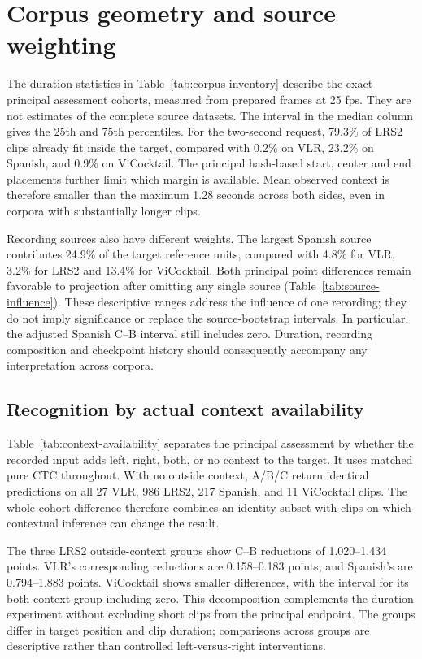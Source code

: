 \section{Corpus geometry and source weighting}
\label{app:corpus}


The duration statistics in Table~\ref{tab:corpus-inventory} describe the exact
principal assessment cohorts, measured from prepared frames at 25 fps. They
are not estimates of the complete source datasets. The interval in the median
column gives the 25th and 75th percentiles. For the two-second request, 79.3\%
of LRS2 clips already fit inside the target, compared with 0.2\% on VLR,
23.2\% on Spanish, and 0.9\% on ViCocktail. The principal hash-based start,
center and end placements further limit which margin is available. Mean
observed context is therefore smaller than the maximum 1.28 seconds across
both sides, even in corpora with substantially longer clips.

Recording sources also have different weights. The largest Spanish source
contributes 24.9\% of the target reference units, compared with 4.8\% for VLR,
3.2\% for LRS2 and 13.4\% for ViCocktail. Both principal point differences
remain favorable to projection after omitting any single source
(Table~\ref{tab:source-influence}). These descriptive ranges address the
influence of one recording; they do not imply significance or replace the
source-bootstrap intervals. In particular, the adjusted Spanish C--B
interval still includes zero. Duration, recording composition and checkpoint
history should consequently accompany any interpretation across corpora.

\subsection{Recognition by actual context availability}
\label{app:availability}

Table~\ref{tab:context-availability} separates the principal assessment by
whether the recorded input adds left, right, both, or no context to the target.
It uses matched pure CTC throughout. With no outside context, A/B/C return
identical predictions on all 27 VLR, 986 LRS2, 217 Spanish, and 11 ViCocktail
clips. The whole-cohort difference therefore combines an identity subset with
clips on which contextual inference can change the result.

The three LRS2 outside-context groups show C--B reductions of 1.020--1.434
points. VLR's corresponding reductions are 0.158--0.183 points, and Spanish's
are 0.794--1.883 points. ViCocktail shows smaller differences, with the interval
for its both-context group including zero. This decomposition complements the
duration experiment without excluding short clips from the principal endpoint.
The groups differ in target position and clip duration; comparisons across
groups are descriptive rather than controlled left-versus-right interventions.

